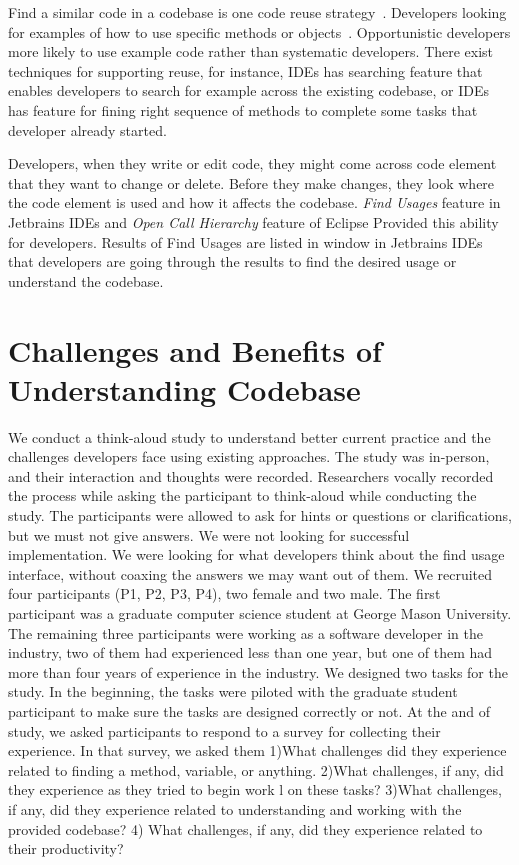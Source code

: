 \documentclass[conference]{IEEEtran}
\begin{document}
Find a similar code in a codebase is one code reuse strategy~\cite{rosson1996reuse}. Developers looking for examples of how to use specific methods or objects~\cite{stylos2006mica,umarji2008archetypal}. Opportunistic developers more likely to use example code rather than systematic developers. There exist techniques for supporting reuse, for instance, IDEs has searching feature that enables developers to search for example across the existing codebase, or IDEs has feature for fining right sequence of methods to complete some tasks that developer already started.\par

Developers, when they write or edit code, they might come across code element that they want to change or delete. Before they make changes, they look where the code element is used and how it affects the codebase. \textit{Find Usages} feature in Jetbrains IDEs and \textit{Open Call Hierarchy} feature of Eclipse Provided this ability for developers. Results of Find Usages are listed in window in Jetbrains IDEs that developers are going through the results to find the desired usage or understand the codebase. 
\par



\section{Challenges and Benefits of Understanding Codebase}
We conduct a think-aloud study to understand better current practice and the challenges developers face using existing approaches. The study was in-person, and their interaction and thoughts were recorded. Researchers vocally recorded the process while asking the participant to think-aloud while conducting the study. The participants were allowed to ask for hints or questions or clarifications, but we must not give answers.
We were not looking for successful implementation. We were looking for what developers think about the find usage interface, without coaxing the answers we may want out of them.
We recruited four participants (P1, P2, P3, P4), two female and two male. The first participant was a graduate computer science student at George Mason University. The remaining three participants were working as a software developer in the industry, two of them had experienced less than one year, but one of them had more than four years of experience in the industry. We designed two tasks for the study. In the beginning, the tasks were piloted with the graduate student participant to make sure the tasks are designed correctly or not. At the and of study, we asked participants to respond to a survey for collecting their experience. In that survey, we asked them 1)What challenges did they experience related to finding a method, variable, or anything. 2)What challenges, if any, did they experience as they tried to begin work l on these tasks? 3)What challenges, if any, did they experience related to understanding and working with the provided codebase?   4) What challenges, if any, did they experience related to their productivity? 
\end{document}
